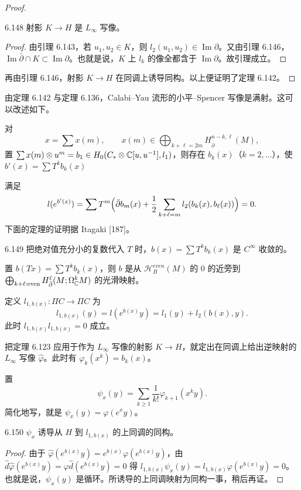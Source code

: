 \begin{proof}
\begin{lemma*}{6.148}
  射影 $K\to H$ 是 $L_{\infty}$ 写像。
\end{lemma*}

\begin{proof}
  由引理 6.143，若 $u_1,u_2\in K$，则 $l_2(u_1,u_2)\in\operatorname{Im}\partial$。又由引理 6.146，$\operatorname{Im}\bar\partial\cap K\subset\operatorname{Im}\partial$。也就是说，$K$ 上 $l_k$ 的像全都含于 $\operatorname{Im}\partial$。故引理成立。
\end{proof}

再由引理 6.146，射影 $K\to H$ 在同调上诱导同构。以上便证明了定理 6.142。
\end{proof}

由定理 6.142 与定理 6.136，Calabi–Yau 流形的小平–Spencer 写像是满射。这可以改述如下。

对
\[
  x=\sum x(m),\qquad x(m)\in\bigoplus_{k+\ell=2m}H^{n-k,\ell}_{\bar\partial}(M),
\]
置 $\sum x(m)\otimes u^m=b_1\in H_0(C_*\otimes\mathbb{C}[u,u^{-1}],l_1)$，则存在 $b_k(x)$（$k=2,\dots$），使 $b'(x)=\sum T^kb_k(x)$

满足
\[
  l(e^{b'(x)})=\sum T^m\Bigl(\bar\partial b_m(x)+\frac{1}{2}\sum_{k+\ell=m}l_2(b_k(x),b_\ell(x))\Bigr)=0.
\]
下面的定理的证明据 Itagaki [187]。

\begin{theorem}{6.149}
  把绝对值充分小的复数代入 $T$ 时，$b(x)=\sum T^kb_k(x)$ 是 $C^\infty$ 收敛的。
\end{theorem}

置 $b(Tx)=\sum T^kb_k(x)$，则 $b$ 是从 $\mathcal{H}^{even}_B(M)$ 的 $0$ 的近旁到 $\bigoplus_{k+\ell:\mathrm{even}}H^\ell_{\bar\partial}(M;\Omega^k_{\mathbb{C}}M)$ 的光滑映射。

定义 $l_{1,b(x)}\colon\Pi C\to\Pi C$ 为
\[
  l_{1,b(x)}(y)=l(e^{b(x)}y)=l_1(y)+l_2(b(x),y).
\]
此时 $l_{1,b(x)}l_{1,b(x)}=0$ 成立。

把定理 6.123 应用于作为 $L_{\infty}$ 写像的射影 $K\to H$，就定出在同调上给出逆映射的 $L_{\infty}$ 写像 $\hat\varphi$。此时有 $\varphi_k(x^k)=b_k(x)$。

置
\[
  \psi_x(y)=\sum_{k\ge1}\frac{1}{k!}\varphi_{k+1}(x^ky).
\]
简化地写，就是 $\psi_x(y)=\varphi(e^xy)$。

\begin{lemma*}{6.150}
  $\psi_x$ 诱导从 $H$ 到 $l_{1,b(x)}$ 的上同调的同构。
\end{lemma*}

\begin{proof}
  由于 $\hat\varphi(e^{b(x)}y)=e^{b(x)}\varphi(e^{b(x)}y)$，由 $\hat d\hat\varphi(e^{b(x)}y)=\varphi\hat d(e^{b(x)}y)=0$ 得 $l_{1,b(x)}\psi_x(y)=l_{1,b(x)}\varphi(e^{b(x)}y)=0$。也就是说，$\psi_x(y)$ 是循环。所诱导的上同调映射为同构一事，稍后再证。
\end{proof}

